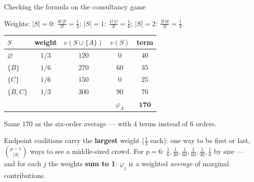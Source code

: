 \documentclass[aspectratio=169,11pt]{beamer}
\begin{document}
\begin{frame}{Checking the formula on the consultancy game}
  \footnotesize
  \begin{numexample}[$\varphi_A {=} 170$ --- now via the subset formula ($p{=}3$)]
    Weights: $|S|=0:\ \tfrac{0!\,2!}{3!}=\tfrac13$;\quad
    $|S|=1:\ \tfrac{1!\,1!}{3!}=\tfrac16$;\quad
    $|S|=2:\ \tfrac{2!\,0!}{3!}=\tfrac13$.
    \begin{center}
    \begin{tabular}{@{}lcccc@{}}
      \toprule
      $S$ & weight & $v(S\cup\{A\})$ & $v(S)$ & term \\
      \midrule
      $\varnothing$ & $1/3$ & $120$ & $0$   & $40$ \\
      $\{B\}$       & $1/6$ & $270$ & $60$  & $35$ \\
      $\{C\}$       & $1/6$ & $150$ & $0$   & $25$ \\
      $\{B,C\}$     & $1/3$ & $300$ & $90$  & $70$ \\
      \midrule
      & & & $\varphi_A$ & $\mathbf{170}$ \\
      \bottomrule
    \end{tabular}
    \end{center}
    Same $170$ as the six-order average --- with $4$ terms instead of $6$ orders.
  \end{numexample}
  \begin{takeaway}
    Endpoint coalitions carry the \textbf{largest} weight ($\tfrac13$ each): one way to
    be first or last, $\binom{p-1}{|S|}$ ways to see a middle-sized crowd. For $p=6$:
    $\tfrac16, \tfrac1{30}, \tfrac1{60}, \tfrac1{60}, \tfrac1{30}, \tfrac16$ by size ---
    and for each $j$ the weights \textbf{sum to 1}: $\varphi_j$ is a weighted
    \emph{average} of marginal contributions.
  \end{takeaway}
\end{frame}
\end{document}
